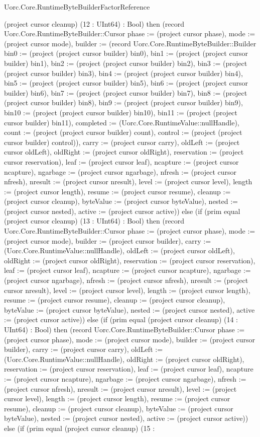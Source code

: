 \begin{lexlean}{Uorc.Core.RuntimeByteBuilderFactorReference}
\begin{semanticmodule}
{(project cursor cleanup) (12 : UInt64) : Bool) then (record Uorc.Core.RuntimeByteBuilder::Cursor {phase := (project cursor phase), mode := (project cursor mode), builder := (record Uorc.Core.RuntimeByteBuilder::Builder {bin0 := (project (project cursor builder) bin0), bin1 := (project (project cursor builder) bin1), bin2 := (project (project cursor builder) bin2), bin3 := (project (project cursor builder) bin3), bin4 := (project (project cursor builder) bin4), bin5 := (project (project cursor builder) bin5), bin6 := (project (project cursor builder) bin6), bin7 := (project (project cursor builder) bin7), bin8 := (project (project cursor builder) bin8), bin9 := (project (project cursor builder) bin9), bin10 := (project (project cursor builder) bin10), bin11 := (project (project cursor builder) bin11), completed := (Uorc.Core.RuntimeValue::nullHandle), count := (project (project cursor builder) count), control := (project (project cursor builder) control)}), carry := (project cursor carry), oldLeft := (project cursor oldLeft), oldRight := (project cursor oldRight), reservation := (project cursor reservation), leaf := (project cursor leaf), ncapture := (project cursor ncapture), ngarbage := (project cursor ngarbage), nfresh := (project cursor nfresh), nresult := (project cursor nresult), level := (project cursor level), length := (project cursor length), resume := (project cursor resume), cleanup := (project cursor cleanup), byteValue := (project cursor byteValue), nested := (project cursor nested), active := (project cursor active)}) else (if (prim equal (project cursor cleanup) (13 : UInt64) : Bool) then (record Uorc.Core.RuntimeByteBuilder::Cursor {phase := (project cursor phase), mode := (project cursor mode), builder := (project cursor builder), carry := (Uorc.Core.RuntimeValue::nullHandle), oldLeft := (project cursor oldLeft), oldRight := (project cursor oldRight), reservation := (project cursor reservation), leaf := (project cursor leaf), ncapture := (project cursor ncapture), ngarbage := (project cursor ngarbage), nfresh := (project cursor nfresh), nresult := (project cursor nresult), level := (project cursor level), length := (project cursor length), resume := (project cursor resume), cleanup := (project cursor cleanup), byteValue := (project cursor byteValue), nested := (project cursor nested), active := (project cursor active)}) else (if (prim equal (project cursor cleanup) (14 : UInt64) : Bool) then (record Uorc.Core.RuntimeByteBuilder::Cursor {phase := (project cursor phase), mode := (project cursor mode), builder := (project cursor builder), carry := (project cursor carry), oldLeft := (Uorc.Core.RuntimeValue::nullHandle), oldRight := (project cursor oldRight), reservation := (project cursor reservation), leaf := (project cursor leaf), ncapture := (project cursor ncapture), ngarbage := (project cursor ngarbage), nfresh := (project cursor nfresh), nresult := (project cursor nresult), level := (project cursor level), length := (project cursor length), resume := (project cursor resume), cleanup := (project cursor cleanup), byteValue := (project cursor byteValue), nested := (project cursor nested), active := (project cursor active)}) else (if (prim equal (project cursor cleanup) (15 : }
\end{semanticmodule}
\end{lexlean}

